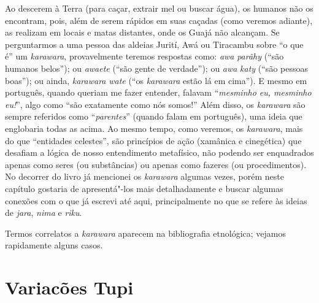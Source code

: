 Ao descerem à Terra (para caçar, extrair mel ou buscar água), os humanos
não os encontram, pois, além de serem rápidos em suas caçadas (como
veremos adiante), as realizam em locais e matas distantes, onde os Guajá
não alcançam. Se perguntarmos a uma pessoa das aldeias Jurití, Awá ou
Tiracambu sobre ``o que é'' um \emph{karawara}, provavelmente teremos
respostas como: \emph{awa} \emph{parãhy} (``são humanos belos''); ou
\emph{awaete} (``são gente de verdade''); ou \emph{awa} \emph{katy} (``são
pessoas boas''); ou ainda, \emph{karawara} \emph{wate} (``os
\emph{karawara} estão lá em cima''). E mesmo em português, quando queriam
me fazer entender, falavam ``\emph{mesminho eu, mesminho eu!}'', algo como
``são exatamente como nós somos!'' Além disso, os \emph{karawara} são
sempre referidos como ``\emph{parentes}'' (quando falam em português), uma
ideia que englobaria todas as acima. Ao mesmo tempo, como veremos, os
\emph{karawara}, mais do que ``entidades celestes'', são princípios de
ação (xamânica e cinegética) que desafiam a lógica de nosso entendimento
metafísico, não podendo ser enquadrados apenas como seres (ou
substâncias) ou apenas como fazeres (ou procedimentos). No decorrer do
livro já mencionei os \emph{karawara} algumas vezes, porém neste
capítulo gostaria de apresentá"-los mais detalhadamente e buscar algumas
conexões com o que já escrevi até aqui, principalmente no que se refere
às ideias de \emph{jara}, \emph{nima} e \emph{riku}.

Termos correlatos a \emph{karawara} aparecem na bibliografia etnológica;
vejamos rapidamente alguns casos.

\section{Variacões Tupi}\label{variacuxf5es-tupi}

